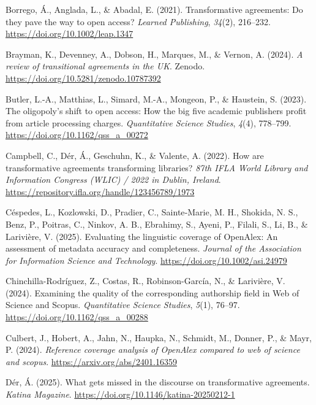 \documentclass[a4paper,man,floatsintext,longtable,noextraspace,10pt]{apa6}
\newlength{\cslhangindent}
\newenvironment{CSLReferences}[2] %
{\begin{list}{}{%
  \setlength{\itemindent}{0pt}
  \setlength{\leftmargin}{0pt}
  \setlength{\parsep}{0pt}
  \ifodd #1
  \setlength{\leftmargin}{\cslhangindent}
  \setlength{\itemindent}{-1\cslhangindent}
  \fi
  \setlength{\itemsep}{#2\baselineskip}}}
{\end{list}}
\begin{document}
\begin{CSLReferences}{1}{0}
Borrego, Á., Anglada, L., \& Abadal, E. (2021). Transformative
agreements: Do they pave the way to open access? \emph{Learned
Publishing}, \emph{34}(2), 216--232.
\url{https://doi.org/10.1002/leap.1347}

Brayman, K., Devenney, A., Dobson, H., Marques, M., \& Vernon, A.
(2024). \emph{A review of transitional agreements in the {UK}}. Zenodo.
\url{https://doi.org/10.5281/zenodo.10787392}

Butler, L.-A., Matthias, L., Simard, M.-A., Mongeon, P., \& Haustein, S.
(2023). The oligopoly's shift to open access: How the big five academic
publishers profit from article processing charges. \emph{Quantitative
Science Studies}, \emph{4}(4), 778--799.
\url{https://doi.org/10.1162/qss_a_00272}

Campbell, C., Dér, Á., Geschuhn, K., \& Valente, A. (2022). How are
transformative agreements transforming libraries? \emph{87th IFLA World
Library and Information Congress (WLIC) / 2022 in Dublin, Ireland}.
\url{https://repository.ifla.org/handle/123456789/1973}

Céspedes, L., Kozlowski, D., Pradier, C., Sainte‐Marie, M. H., Shokida,
N. S., Benz, P., Poitras, C., Ninkov, A. B., Ebrahimy, S., Ayeni, P.,
Filali, S., Li, B., \& Larivière, V. (2025). Evaluating the linguistic
coverage of {OpenAlex}: An assessment of metadata accuracy and
completeness. \emph{Journal of the Association for Information Science
and Technology}. \url{https://doi.org/10.1002/asi.24979}

Chinchilla-Rodríguez, Z., Costas, R., Robinson-García, N., \& Larivière,
V. (2024). Examining the quality of the corresponding authorship field
in {Web of Science} and {Scopus}. \emph{Quantitative Science Studies},
\emph{5}(1), 76--97. \url{https://doi.org/10.1162/qss_a_00288}

Culbert, J., Hobert, A., Jahn, N., Haupka, N., Schmidt, M., Donner, P.,
\& Mayr, P. (2024). \emph{Reference coverage analysis of OpenAlex
compared to web of science and scopus}.
\url{https://arxiv.org/abs/2401.16359}

Dér, Á. (2025). What gets missed in the discourse on transformative
agreements. \emph{Katina Magazine}.
\url{https://doi.org/10.1146/katina-20250212-1}


\end{CSLReferences}
\end{document}
